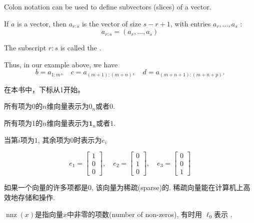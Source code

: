 \begin{definition}[Subvectors]
    Colon notation can be used to define subvectors (slices) of a vector.

    If $ a $ is a vector, then $ a_{r: s} $ is the vector of size $ s-r+1 $, with entries $ a_{r}, \ldots, a_{s} $ :
    $$
    a_{r: s}=\left(a_{r}, \ldots, a_{s}\right)
    $$

    The subscript $ r:s $ is called the . 
\end{definition}

Thus, in our example above, we have
    $$
    b=a_{1: m}, \quad c=a_{(m+1):(m+n)}, \quad d=a_{(m+n+1):(m+n+p)} .
    $$

\begin{remark}
    在本书中，下标从1开始。
\end{remark}

\begin{definition}[零向量]
    所有项为$0$的$n$维向量表示为$0_n$或者$0$.
\end{definition}

\begin{definition}[全一向量]
      所有项为1的$n$维向量表示为$\boldsymbol{1}_n$或者$1$.
\end{definition}

\begin{definition}[单位向量]
    当第$i$项为$1$, 其余项为$0$时表示为$e_i$
\end{definition}

\begin{example}
    $$ {e}_{1}=\left[\begin{array}{l}1 \\ 0 \\ 0\end{array}\right], \quad e_{2}=\left[\begin{array}{l}0 \\ 1 \\ 0\end{array}\right], \quad e_{3}=\left[\begin{array}{l}0 \\ 0 \\ 1\end{array}\right] $$
\end{example}

\begin{definition}[稀疏向量]
    如果一个向量的许多项都是0, 该向量为稀疏(sparse)的. 稀疏向量能在计算机上高效地存储和操作. 

$\operatorname{nnz}(x)$是指向量$x$中非零的项数(number of non-zeros), 有时用 $\ell_0$表示 . 

\end{definition}

